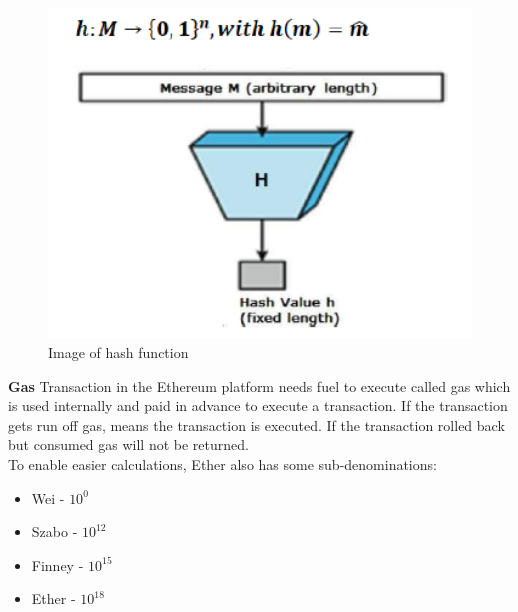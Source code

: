 \begin{center}
	\begin{figure}[htb!]
		
		\begin{minipage}{0.2\linewidth}
			\centering
			\includegraphics[width=4.5\textwidth]{images/chap01_hash_function.png}
		\end{minipage}
		\caption[Image of hash function]{Image of hash function}
		
	\end{figure}
	
\end{center}
\textbf{Gas} Transaction in the Ethereum platform needs fuel to execute called gas which is used internally and paid in advance to execute a transaction. If the transaction gets run off gas, means the transaction is executed. If the transaction rolled back but consumed gas will not be returned.\\
To enable easier calculations, Ether also has some sub-denominations\cite{Egbertsen}:\\
\begin{itemize}
	\item Wei - $10^0$
	\item Szabo - $10^12$
	\item Finney - $10^15$
	\item Ether - $10^18$
\end{itemize}
